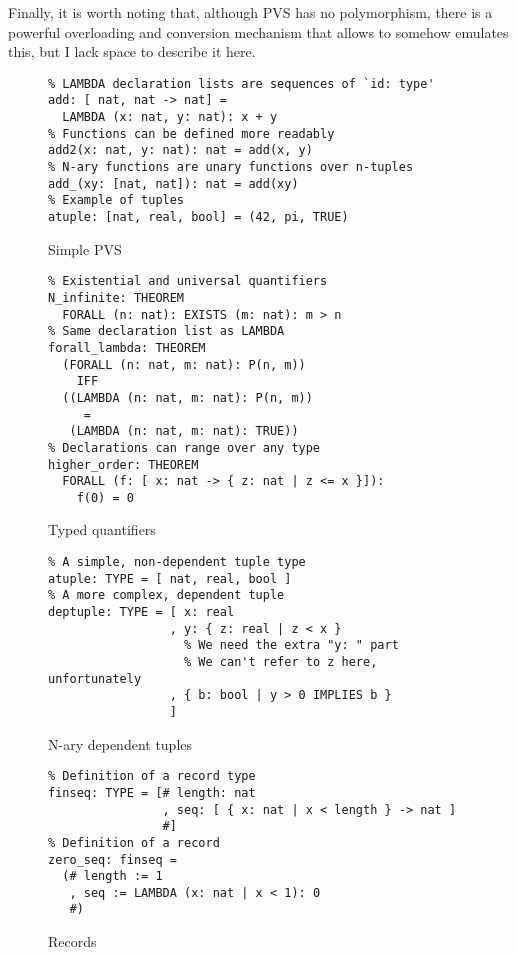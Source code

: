 \documentclass[utf8,a4paper]{article}
\begin{document}
Finally, it is worth noting that, although PVS has no polymorphism,
there is a powerful overloading and conversion mechanism that allows
to somehow emulates this, but I lack space to describe it here.

\begin{figure}
  \centering
  \begin{verbatim}
% LAMBDA declaration lists are sequences of `id: type'
add: [ nat, nat -> nat] =
  LAMBDA (x: nat, y: nat): x + y
% Functions can be defined more readably
add2(x: nat, y: nat): nat = add(x, y)
% N-ary functions are unary functions over n-tuples
add_(xy: [nat, nat]): nat = add(xy)
% Example of tuples
atuple: [nat, real, bool] = (42, pi, TRUE)
  \end{verbatim}
  \caption{Simple PVS}
  \label{fig:simpleterms}
\end{figure}

\begin{figure}
  \centering
  \begin{verbatim}
% Existential and universal quantifiers
N_infinite: THEOREM
  FORALL (n: nat): EXISTS (m: nat): m > n
% Same declaration list as LAMBDA
forall_lambda: THEOREM
  (FORALL (n: nat, m: nat): P(n, m))
    IFF
  ((LAMBDA (n: nat, m: nat): P(n, m))
     =
   (LAMBDA (n: nat, m: nat): TRUE))
% Declarations can range over any type
higher_order: THEOREM
  FORALL (f: [ x: nat -> { z: nat | z <= x }]):
    f(0) = 0
  \end{verbatim}
  \caption{Typed quantifiers}
  \label{fig:quant}
\end{figure}

\begin{figure}
  \centering
  \begin{verbatim}
% A simple, non-dependent tuple type
atuple: TYPE = [ nat, real, bool ]
% A more complex, dependent tuple
deptuple: TYPE = [ x: real
                 , y: { z: real | z < x }
                   % We need the extra "y: " part
                   % We can't refer to z here, unfortunately
                 , { b: bool | y > 0 IMPLIES b }
                 ]
  \end{verbatim}
  \caption{N-ary dependent tuples}
  \label{fig:tupletypes}
\end{figure}

\begin{figure}
  \centering
  \begin{verbatim}
% Definition of a record type
finseq: TYPE = [# length: nat
                , seq: [ { x: nat | x < length } -> nat ]
                #]
% Definition of a record
zero_seq: finseq =
  (# length := 1
   , seq := LAMBDA (x: nat | x < 1): 0
   #)
  \end{verbatim}
  \caption{Records}
  \label{fig:records}
\end{figure}
\end{document}
